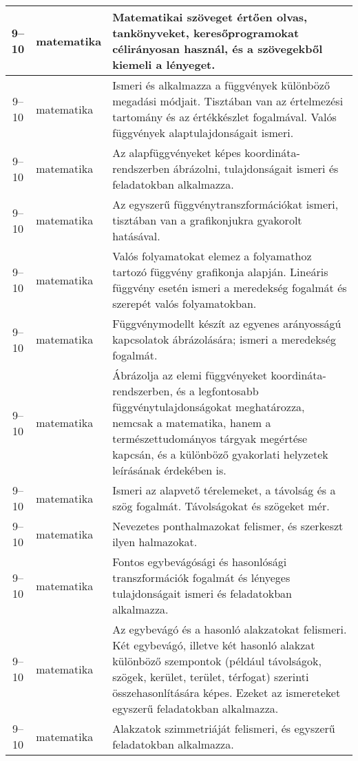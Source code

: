 \begin{small}
\begin{longtable}{c | p{2cm} |  p{11cm} }
              9--10 & matematika & Matematikai szöveget értően olvas, tankönyveket, keresőprogramokat célirányosan használ, és a szövegekből kiemeli a lényeget. \\ \hline
              9--10 & matematika & Ismeri és alkalmazza a függvények különböző megadási módjait. Tisztában van az értelmezési tartomány és az értékkészlet fogalmával. Valós függvények alaptulajdonságait ismeri. \\ \hline
              9--10 & matematika & Az alapfüggvényeket képes koordináta-rendszerben ábrázolni, tulajdonságait ismeri és feladatokban alkalmazza. \\ \hline
              9--10 & matematika & Az egyszerű függvénytranszformációkat ismeri, tisztában van a grafikonjukra gyakorolt hatásával. \\ \hline
              9--10 & matematika & Valós folyamatokat elemez a folyamathoz tartozó függvény grafikonja alapján. Lineáris függvény esetén ismeri a meredekség fogalmát és szerepét valós folyamatokban. \\ \hline
              9--10 & matematika & Függvénymodellt készít az egyenes arányosságú kapcsolatok ábrázolására; ismeri a meredekség fogalmát. \\ \hline
              9--10 & matematika & Ábrázolja az elemi függvényeket koordináta-rendszerben, és a legfontosabb függvénytulajdonságokat meghatározza, nemcsak a matematika, hanem a természettudományos tárgyak megértése kapcsán, és a különböző gyakorlati helyzetek leírásának érdekében is. \\ \hline
              9--10 & matematika & Ismeri az alapvető térelemeket, a távolság és a szög fogalmát. Távolságokat és szögeket mér. \\ \hline
              9--10 & matematika & Nevezetes ponthalmazokat felismer, és szerkeszt ilyen halmazokat. \\ \hline
              9--10 & matematika & Fontos egybevágósági és hasonlósági transzformációk fogalmát  és lényeges tulajdonságait ismeri és feladatokban alkalmazza. \\ \hline
              9--10 & matematika & Az egybevágó és a hasonló alakzatokat felismeri. Két egybevágó, illetve két hasonló alakzat különböző szempontok (például távolságok, szögek, kerület, terület, térfogat) szerinti összehasonlítására képes. Ezeket az ismereteket egyszerű feladatokban alkalmazza. \\ \hline
              9--10 & matematika & Alakzatok szimmetriáját felismeri, és egyszerű feladatokban alkalmazza. \\ \hline

\end{longtable}
\end{small}
